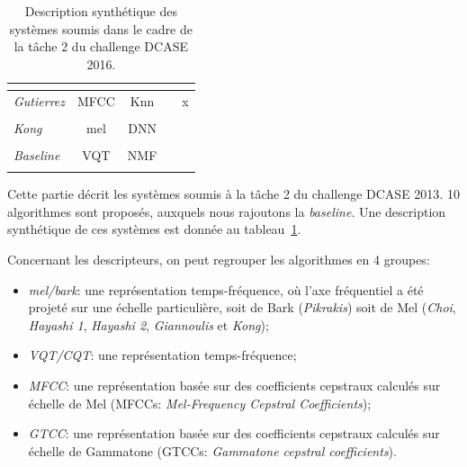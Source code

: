 \begin{table}[t]
\begin{center}
\begin{tabular}{lcccc}
\citep{Vu2016}               &                              &                      &           & \\ 
\hline
\emph{Gutierrez}             &     MFCC                     & Knn                  &           & x \\ 
\citep{GutierrezArriola2016} &                              &                      &           & \\ 
\hline
\emph{Kong}                  &     mel                      & DNN                  &           &  \\ 
\citep{Kong2016}             &                              &                      &           & \\ 
\hline  
\emph{Baseline}              &     VQT                      & NMF                  &           & \\ 
\citep{Benetos2016}          &                              &                      &           & \\ 
\hline 
\end{tabular}
\end{center}
\caption{Description synthétique des systèmes soumis dans le cadre de la tâche 2 du challenge DCASE 2016.}
\label{tab:systemsDcase2016}
\end{table}

Cette partie décrit les systèmes soumis à la tâche 2 du challenge DCASE 2013. 10 algorithmes sont proposés, auxquels nous rajoutons la \emph{baseline}. Une description synthétique de ces systèmes est donnée au tableau~\ref{tab:systemsDcase2016}. 

Concernant les descripteurs, on peut regrouper les algorithmes en 4 groupes:

\begin{itemize}
\item \emph{mel/bark}: une représentation temps-fréquence, où l'axe fréquentiel a été projeté sur une échelle particulière, soit de Bark (\emph{Pikrakis}) soit de Mel (\emph{Choi}, \emph{Hayashi 1}, \emph{Hayashi 2}, \emph{Giannoulis} et \emph{Kong});
\item \emph{VQT/CQT}: une représentation temps-fréquence;  %
\item \emph{MFCC}: une représentation basée sur des coefficients cepstraux calculés sur échelle de Mel (MFCCs: \emph{Mel-Frequency Cepstral Coefficients});
\item \emph{GTCC}: une représentation basée sur des coefficients cepstraux calculés sur échelle de Gammatone (GTCCs: \emph{Gammatone cepstral coefficients}).
\end{itemize}

